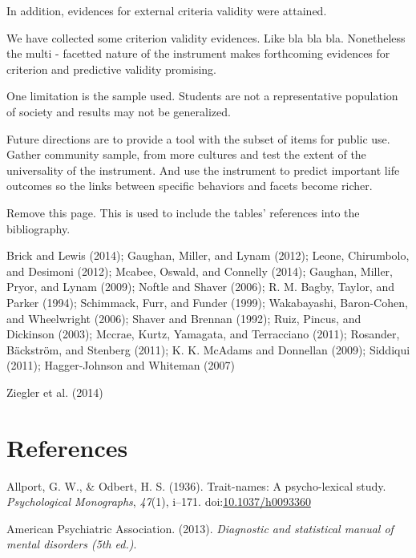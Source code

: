 \documentclass[,man,floatsintext]{apa6}
\begin{document}
In addition, evidences for external criteria validity were attained.

We have collected some criterion validity evidences. Like bla bla bla.
Nonetheless the multi - facetted nature of the instrument makes
forthcoming evidences for criterion and predictive validity promising.

One limitation is the sample used. Students are not a representative
population of society and results may not be generalized.

Future directions are to provide a tool with the subset of items for
public use. Gather community sample, from more cultures and test the
extent of the universality of the instrument. And use the instrument to
predict important life outcomes so the links between specific behaviors
and facets become richer.

\newpage

Remove this page. This is used to include the tables' references into
the bibliography.

Brick and Lewis (2014); Gaughan, Miller, and Lynam (2012); Leone,
Chirumbolo, and Desimoni (2012); Mcabee, Oswald, and Connelly (2014);
Gaughan, Miller, Pryor, and Lynam (2009); Noftle and Shaver (2006); R.
M. Bagby, Taylor, and Parker (1994); Schimmack, Furr, and Funder (1999);
Wakabayashi, Baron-Cohen, and Wheelwright (2006); Shaver and Brennan
(1992); Ruiz, Pincus, and Dickinson (2003); Mccrae, Kurtz, Yamagata, and
Terracciano (2011); Rosander, Bäckström, and Stenberg (2011); K. K.
McAdams and Donnellan (2009); Siddiqui (2011); Hagger-Johnson and
Whiteman (2007)

Ziegler et al. (2014)

\newpage

\section{References}\label{references}

\begingroup
\setlength{\parindent}{-0.5in} \setlength{\leftskip}{0.5in}

\hypertarget{refs}{}
\hypertarget{ref-AllportOdbert1936}{}
Allport, G. W., \& Odbert, H. S. (1936). Trait-names: A psycho-lexical
study. \emph{Psychological Monographs}, \emph{47}(1), i--171.
doi:\href{https://doi.org/10.1037/h0093360}{10.1037/h0093360}

\hypertarget{ref-APA2013}{}
American Psychiatric Association. (2013). \emph{Diagnostic and
statistical manual of mental disorders (5th ed.)}.
\end{document}

